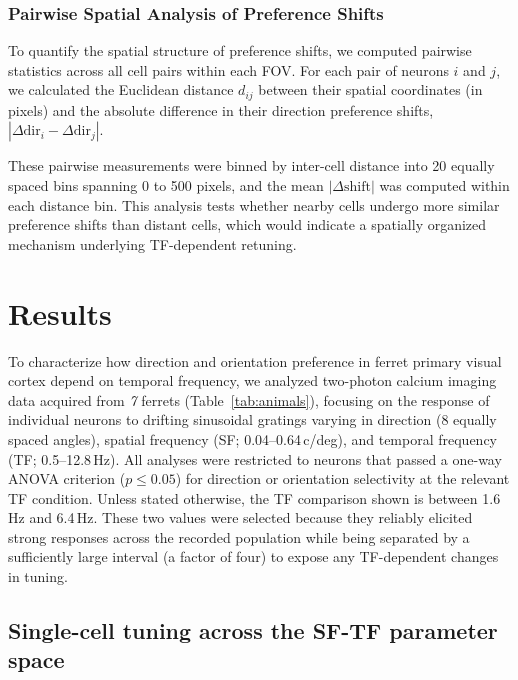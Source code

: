 \documentclass{brandeis-thesis3.3}
\begin{document}
\subsection{Pairwise Spatial Analysis of Preference Shifts}


To quantify the spatial structure of preference shifts, we
computed pairwise statistics across all cell pairs within each
FOV. For each pair of neurons $i$ and $j$, we calculated the
Euclidean distance $d_{ij}$ between their spatial coordinates
(in pixels) and the absolute difference in their direction
preference shifts,
$|\Delta\text{dir}_i - \Delta\text{dir}_j|$.

These pairwise measurements were binned by inter-cell distance
into 20 equally spaced bins spanning 0 to 500 pixels, and the
mean $|\Delta\text{shift}|$ was computed within each distance
bin. This analysis tests whether nearby cells undergo more
similar preference shifts than distant cells, which would
indicate a spatially organized mechanism underlying
TF-dependent retuning.

\chapter[Results]{Results}

To characterize how direction and orientation preference in ferret
primary visual cortex depend on temporal frequency, we analyzed
two-photon calcium imaging data acquired from \textit{7} ferrets
(Table~\ref{tab:animals}), focusing on the response of individual
neurons to drifting sinusoidal gratings varying in direction (8
equally spaced angles), spatial frequency (SF; 0.04--0.64\,c/deg),
and temporal frequency (TF; 0.5--12.8\,Hz). All analyses were
restricted to neurons that passed a one-way ANOVA criterion
($p \leq 0.05$) for direction or orientation selectivity at the
relevant TF condition. Unless stated otherwise, the TF comparison
shown is between 1.6\,Hz and 6.4\,Hz. These two values were
selected because they reliably elicited strong responses across
the recorded population while being separated by a sufficiently
large interval (a factor of four) to expose any TF-dependent
changes in tuning.


\section{Single-cell tuning across the SF-TF parameter space}
\end{document}
